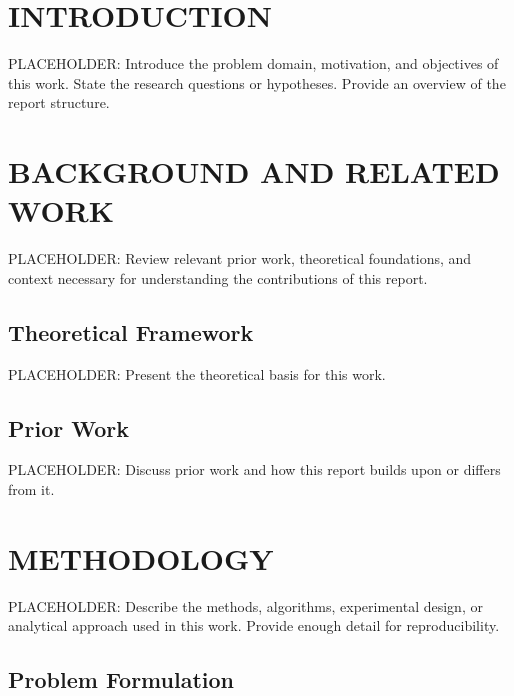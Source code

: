 \documentclass{nrlreport} %
\begin{document}
\chapter{INTRODUCTION}
\label{chap:introduction}

PLACEHOLDER: Introduce the problem domain, motivation, and objectives of this work.
State the research questions or hypotheses. Provide an overview of the report structure.



\chapter{BACKGROUND AND RELATED WORK}
\label{chap:background}

PLACEHOLDER: Review relevant prior work, theoretical foundations, and context
necessary for understanding the contributions of this report.

\section{Theoretical Framework}
\label{sec:theory}

PLACEHOLDER: Present the theoretical basis for this work.


\section{Prior Work}
\label{sec:prior_work}

PLACEHOLDER: Discuss prior work and how this report builds upon or differs from it.


\chapter{METHODOLOGY}
\label{chap:methods}

PLACEHOLDER: Describe the methods, algorithms, experimental design, or analytical
approach used in this work. Provide enough detail for reproducibility.

\section{Problem Formulation}
\label{sec:formulation}
\end{document}
